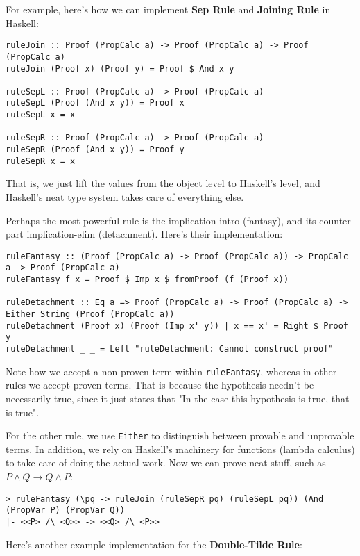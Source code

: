 \documentclass{article}
\begin{document}
For example, here's how we can implement \textbf{Sep Rule} and \textbf{Joining Rule} in Haskell:

\begin{lstlisting}
ruleJoin :: Proof (PropCalc a) -> Proof (PropCalc a) -> Proof (PropCalc a)
ruleJoin (Proof x) (Proof y) = Proof $ And x y

ruleSepL :: Proof (PropCalc a) -> Proof (PropCalc a)
ruleSepL (Proof (And x y)) = Proof x
ruleSepL x = x

ruleSepR :: Proof (PropCalc a) -> Proof (PropCalc a)
ruleSepR (Proof (And x y)) = Proof y
ruleSepR x = x
\end{lstlisting}

That is, we just lift the values from the object level to Haskell's level, and Haskell's neat type system takes care of everything else.

Perhaps the most powerful rule is the implication-intro (fantasy), and its counter-part implication-elim (detachment). Here's their implementation:

\begin{lstlisting}
ruleFantasy :: (Proof (PropCalc a) -> Proof (PropCalc a)) -> PropCalc a -> Proof (PropCalc a)
ruleFantasy f x = Proof $ Imp x $ fromProof (f (Proof x))

ruleDetachment :: Eq a => Proof (PropCalc a) -> Proof (PropCalc a) -> Either String (Proof (PropCalc a))
ruleDetachment (Proof x) (Proof (Imp x' y)) | x == x' = Right $ Proof y
ruleDetachment _ _ = Left "ruleDetachment: Cannot construct proof"
\end{lstlisting}

Note how we accept a non-proven term within \texttt{ruleFantasy}, whereas in other rules we accept proven terms. That is because the hypothesis needn't be necessarily true, since it just states that "In the case this hypothesis is true, that is true".

For the other rule, we use \texttt{Either} to distinguish between provable and unprovable terms. In addition, we rely on Haskell's machinery for functions (lambda calculus) to take care of doing the actual work. Now we can prove neat stuff, such as $P \land Q \to Q \land P$:

\begin{lstlisting}
> ruleFantasy (\pq -> ruleJoin (ruleSepR pq) (ruleSepL pq)) (And (PropVar P) (PropVar Q))
|- <<P> /\ <Q>> -> <<Q> /\ <P>>
\end{lstlisting}

Here's another example implementation for the \textbf{Double-Tilde Rule}:
\end{document}
